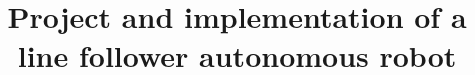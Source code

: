 \documentclass[oneside,11pt]{normas-utf-tex} %
\title{{Project and implementation of a line follower autonomous robot}} %
\begin{document}
\capa %
\folhaderosto %







\listadefiguras %
\listadesiglas %

\sumario %






	


%


\clearpage %

\label{bibstart}
%
\end{document}
